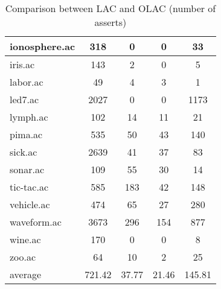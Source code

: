 \begin{table}[htbp]
\begin{tabular}{|l|c|c|c|c|}
		\hline
		ionosphere.ac   & 318           & 0                  & 0                        & 33                            \\
		\hline
		iris.ac         & 143           & 2                  & 0                        & 5                             \\
		\hline
		labor.ac        & 49            & 4                  & 3                        & 1                             \\
		\hline
		led7.ac         & 2027          & 0                  & 0                        & 1173                          \\
		\hline
		lymph.ac        & 102           & 14                 & 11                       & 21                            \\
		\hline
		pima.ac         & 535           & 50                 & 43                       & 140                           \\
		\hline
		sick.ac         & 2639          & 41                 & 37                       & 83                            \\
		\hline
		sonar.ac        & 109           & 55                 & 30                       & 14                            \\
		\hline
		tic-tac.ac      & 585           & 183                & 42                       & 148                           \\
		\hline
		vehicle.ac      & 474           & 65                 & 27                       & 280                           \\
		\hline
		waveform.ac     & 3673          & 296                & 154                      & 877                           \\
		\hline
		wine.ac         & 170           & 0                  & 0                        & 8                             \\
		\hline
		zoo.ac          & 64            & 10                 & 2                        & 25                            \\
		\hline
		average         & 721.42        & 37.77              & 21.46                    & 145.81                        \\
		\hline
		\end{tabular}
	\caption{Comparison between LAC and OLAC (number of asserts)}
	\label{tab:comparison_lac_olac}
\end{table}